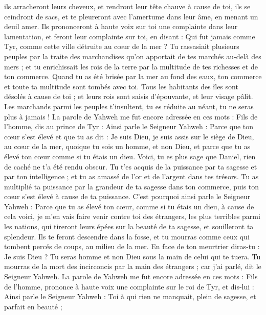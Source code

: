 \begin{multicols}{2}
ils arracheront leurs cheveux, et rendront leur tête chauve à cause de toi, ils se ceindront de sacs, et te pleureront avec l'amertume dans leur âme, en menant un deuil amer.
Ils prononceront à haute voix sur toi une complainte dans leur lamentation, et feront leur complainte sur toi, en disant : Qui fut jamais comme Tyr, comme cette ville détruite au cœur de la mer ?
Tu rassasiait plusieurs peuples par la traite des marchandises qu'on apportait de tes marchés au-delà des mers ; et tu enrichissait les rois de la terre par la multitude de tes richesses et de ton commerce.
Quand tu as été brisée par la mer au fond des eaux, ton commerce et toute ta multitude sont tombés avec toi.
Tous les habitants des îles sont désolés à cause de toi ; et leurs rois sont saisis d'épouvante, et leur visage pâlit.
Les marchands parmi les peuples t'insultent, tu es réduite au néant, tu ne seras plus à jamais !
\VerseOne{}La parole de Yahweh me fut encore adressée en ces mots :
Fils de l'homme, dis au prince de Tyr : Ainsi parle le Seigneur Yahweh : Parce que ton cœur s'est élevé et que tu as dit : Je suis Dieu, je suis assis sur le siège de Dieu, au cœur de la mer, quoique tu sois un homme, et non Dieu, et parce que tu as élevé ton cœur comme si tu étais un dieu.
Voici, tu es plus sage que Daniel, rien de caché ne t'a été rendu obscur.
Tu t'es acquis de la puissance par ta sagesse et par ton intelligence ; et tu as amassé de l'or et de l'argent dans tes trésors.
Tu as multiplié ta puissance par la grandeur de ta sagesse dans ton commerce, puis ton cœur s'est élevé à cause de ta puissance.
C'est pourquoi ainsi parle le Seigneur Yahweh : Parce que tu as élevé ton cœur, comme si tu étais un dieu,
à cause de cela voici, je m'en vais faire venir contre toi des étrangers, les plus terribles parmi les nations, qui tireront leurs épées sur la beauté de ta sagesse, et souilleront ta splendeur.
Ils te feront descendre dans la fosse, et tu mourras comme ceux qui tombent percés de coups, au milieu de la mer.
En face de ton meurtrier diras-tu : Je suis Dieu ? Tu seras homme et non Dieu sous la main de celui qui te tuera.
Tu mourras de la mort des incirconcis par la main des étrangers ; car j'ai parlé, dit le Seigneur Yahweh.
La parole de Yahweh me fut encore adressée en ces mots :
Fils de l'homme, prononce à haute voix une complainte sur le roi de Tyr, et dis-lui : Ainsi parle le Seigneur Yahweh : Toi à qui rien ne manquait, plein de sagesse, et parfait en beauté ;

\end{multicols}
